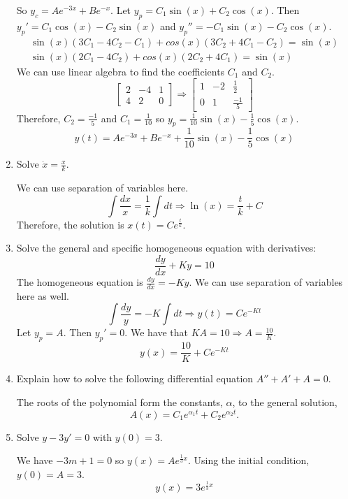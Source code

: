\begin{enumerate}
\[  \]
  So \(y_c = Ae^{-3x} + Be^{-x}\).
  Let \(y_p = C_1\sin(x) + C_2\cos(x)\).
  Then \(y_p' = C_1\cos(x) - C_2\sin(x)\) and
  \(y_p'' = -C_1\sin(x) - C_2\cos(x)\).
  \begin{align*}
    \sin(x)(3C_1 - 4C_2 - C_1) + cos(x)(3C_2 + 4C_1 - C_2) = \sin(x)\\
    \sin(x)(2C_1 - 4C_2) + cos(x)(2C_2 + 4C_1) = \sin(x)
  \end{align*}
  We can use linear algebra to find the coefficients \(C_1\) and \(C_2\).
  \[
  \begin{bmatrix}
    2 & -4 & 1\\
    4 & 2 & 0
  \end{bmatrix}\Rightarrow
  \begin{bmatrix}
    1 & -2 & \frac{1}{2}\\
    0 & 1 & \frac{-1}{5}
  \end{bmatrix}
  \]
  Therefore, \(C_2 = \frac{-1}{5}\) and \(C_1 = \frac{1}{10}\) so
  \(y_p = \frac{1}{10}\sin(x) - \frac{1}{5}\cos(x)\).
  \[
  y(t) = Ae^{-3x} + Be^{-x} + \frac{1}{10}\sin(x) - \frac{1}{5}\cos(x)
  \]
\item
  Solve \(\dot{x} = \frac{x}{k}\).
  \par\smallskip
  We can use separation of variables here.
  \[
  \int\frac{dx}{x} = \frac{1}{k}\int dt\Rightarrow \ln(x) = \frac{t}{k} + C
  \]
  Therefore, the solution is \(x(t) = Ce^{\frac{t}{k}}\).
\item
  Solve the general and specific homogeneous equation with derivatives:
  \[
  \frac{dy}{dx} + Ky = 10
  \]
  The homogeneous equation is \(\frac{dy}{dx} = -Ky\).
  We can use separation of variables here as well.
  \[
  \int\frac{dy}{y} = -K\int dt\Rightarrow y(t) = Ce^{-Kt}
  \]
  Let \(y_p = A\).
  Then \(y_p' = 0\).
  We have that \(KA = 10\Rightarrow A = \frac{10}{K}\).
  \[
  y(x) = \frac{10}{K} + Ce^{-Kt}
  \]
\item
  Explain how to solve the following differential equation \(A'' + A' + A = 0\).
  \par\smallskip
  The roots of the polynomial form the constants, \(\alpha\), to the general
  solution,
  \[
  A(x) = C_1e^{\alpha_1t} + C_2e^{\alpha_2t}.
  \]
\item
  Solve \(y - 3y' = 0\) with \(y(0) = 3\).
  \par\smallskip
  We have \(-3m + 1 = 0\) so \(y(x) = Ae^{\frac{1}{3}x}\).
  Using the initial condition, \(y(0) = A = 3\).
  \[
  y(x) = 3e^{\frac{1}{3}x}
  \]
\end{enumerate}

